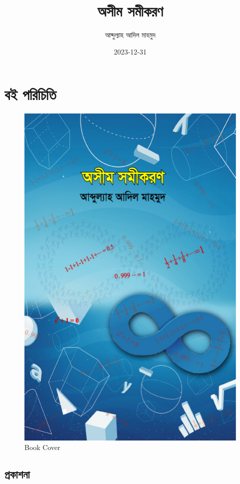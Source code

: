 \documentclass[
]{book}
\title{অসীম সমীকরণ}
\author{আব্দুল্যাহ আদিল মাহমুদ}
\date{2023-12-31}
\begin{document}
\maketitle

{
\setcounter{tocdepth}{1}
\tableofcontents
}
\hypertarget{ux9acux987-ux9aaux9b0ux99aux9a4}{%
\chapter*{বই পরিচিতি}\label{ux9acux987-ux9aaux9b0ux99aux9a4}}

\begin{figure}

{\centering \includegraphics[width=0.8\linewidth]{os_cover} 

}

\caption{Book Cover}\label{fig:cover}
\end{figure}

\hypertarget{ux9aaux9b0ux995ux9b6ux9a8}{%
\section{প্রকাশনা}\label{ux9aaux9b0ux995ux9b6ux9a8}}
\end{document}
